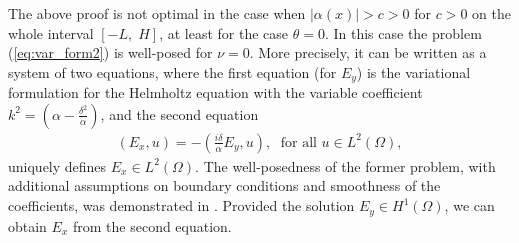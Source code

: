 \begin{remark} 
\label{remark:other}
The above proof is not optimal in the case when $\left|\alpha(x)\right|>c>0$ for $c>0$ on the whole interval $[-L,\; H]$, at least 
for the case $\theta=0$. In this case the problem (\ref{eq:var_form2}) is well-posed for $\nu=0$. More precisely, it can be written 
as a system of two equations, where the first equation (for $E_y$) is the variational formulation for the Helmholtz equation 
with the variable coefficient $k^2=(\alpha-\frac{\delta^2}{\alpha})$, and the second equation 
\begin{align*}
  \left(E_x,u\right)=-\left(\frac{i\delta}{\alpha}E_y,u\right),\; \text{ for all } u\in L^{2}(\Omega), 
\end{align*}
uniquely defines $E_x\in L^{2}(\Omega)$. The well-posedness of the former problem, with additional assumptions on boundary conditions and smoothness of the coefficients, 
was demonstrated in \cite{LMIG_thesis}. Provided the solution $E_y\in H^{1}(\Omega)$, we can obtain $E_x$ from the second equation.



\end{remark}
